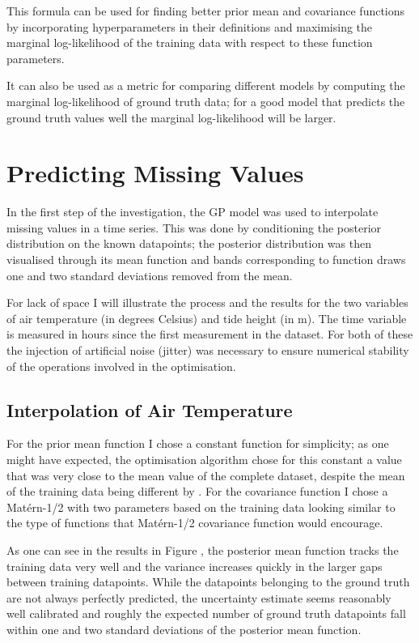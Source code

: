 \documentclass{article}
\begin{document}
            This formula can be used for finding better prior mean and covariance functions by incorporating hyperparameters in their definitions and maximising the marginal log-likelihood of the training data with respect to these function parameters.

            It can also be used as a metric for comparing different models by computing the marginal log-likelihood of ground truth data; for a good model that predicts the ground truth values well the marginal log-likelihood will be larger.

    \section{Predicting Missing Values} \label{sec_interpolation}

            In the first step of the investigation, the GP model was used to interpolate missing values in a time series. This was done by conditioning the posterior distribution on the known datapoints; the posterior distribution was then visualised through its mean function and bands corresponding to function draws one and two standard deviations removed from the mean.
    
            For lack of space I will illustrate the process and the results for the two variables of air temperature (in degrees Celsius) and tide height (in m). The time variable is measured in hours since the first measurement in the dataset. For both of these the injection of artificial noise (jitter) was necessary to ensure numerical stability of the operations involved in the optimisation.
            
            \subsection{Interpolation of Air Temperature}

                For the prior mean function I chose a constant function for simplicity; as one might have expected, the optimisation algorithm chose for this constant a value that was very close to the mean value of the complete dataset, despite the mean of the training data being different by %
                . For the covariance function I chose a Matérn-1/2 with two parameters based on the training data looking similar to the type of functions that Matérn-1/2 covariance function would encourage.

                As one can see in the results in Figure %
                , the posterior mean function tracks the training data very well and the variance increases quickly in the larger gaps between training datapoints. While the datapoints belonging to the ground truth are not always perfectly predicted, the uncertainty estimate seems reasonably well calibrated and roughly the expected number of ground truth datapoints fall within one and two standard deviations of the posterior mean function.
\end{document}
